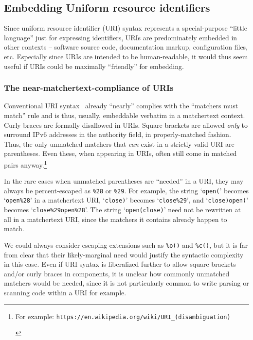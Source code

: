 \subsection{Embedding Uniform resource identifiers}
\label{app:uri:embed}

Since uniform resource identifier (URI) syntax represents
a special-purpose ``little language'' just for expressing identifiers,
URIs are predominately embedded in other contexts --
software source code, documentation markup, configuration files, etc.
Especially since URIs are intended to be human-readable,
it would thus seem useful if URIs
could be maximally ``friendly'' for embedding.

\subsubsection{The near-matchertext-compliance of URIs}

Conventional URI syntax~\cite{rfc3986}
already ``nearly'' complies with the ``matchers must match'' rule
and is thus, usually, embeddable verbatim in a matchertext context.
Curly braces are formally disallowed in URIs.
Square brackets are allowed \emph{only} to surround IPv6 addresses
in the authority field,
in properly-matched fashion.
Thus, the only unmatched matchers that \emph{can} exist
in a strictly-valid URI are parentheses.
Even these, when appearing in URIs,
often still come in matched pairs anyway.\footnote{\begin{tiny}
	For example:
	\texttt{https://en.wikipedia.org/wiki/URI\_(disambiguation)}
	\end{tiny}}

In the rare cases when unmatched parentheses are ``needed'' in a URI,
they may always be percent-escaped as \verb|%28| or \verb|%29|.
For example, the string `\verb|open(|'
becomes `\verb|open%28|' in a matchertext URI,
`\verb|close)|'
becomes `\verb|close%29|',
and `\verb|close)open(|' becomes
`\verb|close%29open%28|'.
The string `\verb|open(close)|'
need not be rewritten at all in a matchertext URI,
since the matchers it contains already happen to match.

We could always consider escaping extensions
such as \verb|%o()| and \verb|%c()|,
but it is far from clear that their likely-marginal need
would justify the syntactic complexity in this case.
Even if URI syntax is liberalized further to allow
square brackets and/or curly braces in components,
it is unclear how commonly unmatched matchers would be needed,
since it is not particularly common to write parsing or scanning code
within a URI for example.


